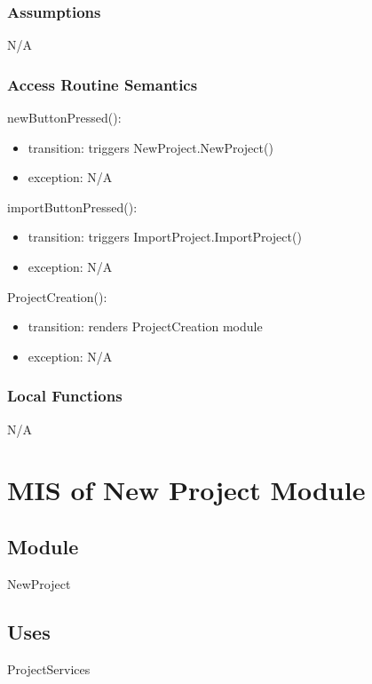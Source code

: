 \documentclass[12pt, titlepage]{article}
\begin{document}
	\subsubsection{Assumptions}
	N/A
	
	\subsubsection{Access Routine Semantics}
	
	\noindent newButtonPressed():
	\begin{itemize}
		\item transition: triggers NewProject.NewProject()
		\item exception: N/A
	\end{itemize}
	\noindent importButtonPressed():
	\begin{itemize}
		\item transition: triggers ImportProject.ImportProject()
		\item exception: N/A
	\end{itemize}
	\noindent ProjectCreation():
	\begin{itemize}
		\item transition: renders ProjectCreation module
		\item exception: N/A
	\end{itemize}
	
	\subsubsection{Local Functions}
	
	N/A
	
	\newpage
	
	\section{MIS of New Project Module} \label{Module} 
	
	\subsection{Module}
	
	NewProject
	
	\subsection{Uses}
	ProjectServices
	
\end{document}
